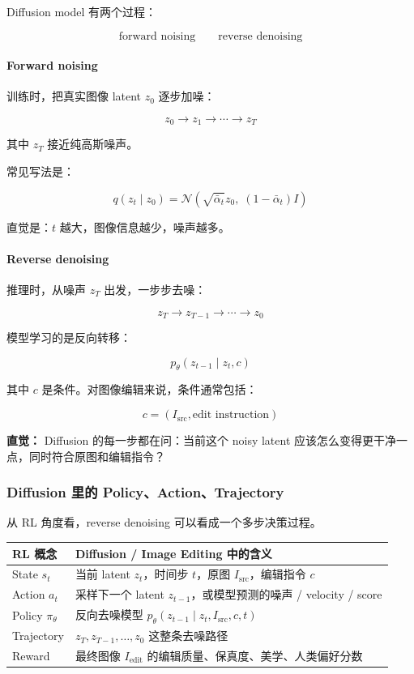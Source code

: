 Diffusion model 有两个过程：

\[
\text{forward noising}
\qquad
\text{reverse denoising}
\]

\paragraph{Forward noising}

训练时，把真实图像 latent $z_0$ 逐步加噪：

\[
z_0
\to
z_1
\to
\cdots
\to
z_T
\]

其中 $z_T$ 接近纯高斯噪声。

常见写法是：

\[
q(z_t \mid z_0)
=
\mathcal{N}
\left(
\sqrt{\bar{\alpha}_t}z_0,\;
(1-\bar{\alpha}_t)I
\right)
\]

直觉是：$t$ 越大，图像信息越少，噪声越多。

\paragraph{Reverse denoising}

推理时，从噪声 $z_T$ 出发，一步步去噪：

\[
z_T
\to
z_{T-1}
\to
\cdots
\to
z_0
\]

模型学习的是反向转移：

\[
p_\theta(z_{t-1}\mid z_t,c)
\]

其中 $c$ 是条件。对图像编辑来说，条件通常包括：

\[
c = (I_\text{src}, \text{edit instruction})
\]

\begin{intubox}
\textbf{直觉：} Diffusion 的每一步都在问：当前这个 noisy latent 应该怎么变得更干净一点，同时符合原图和编辑指令？
\end{intubox}

\subsubsection{Diffusion 里的 Policy、Action、Trajectory}

从 RL 角度看，reverse denoising 可以看成一个多步决策过程。

\begin{center}
{\small
\begin{tabular}{p{3cm}p{9.8cm}}
\hline
\textbf{RL 概念} & \textbf{Diffusion / Image Editing 中的含义} \\
\hline
State $s_t$
&
当前 latent $z_t$，时间步 $t$，原图 $I_\text{src}$，编辑指令 $c$
\\
Action $a_t$
&
采样下一个 latent $z_{t-1}$，或模型预测的噪声 / velocity / score
\\
Policy $\pi_\theta$
&
反向去噪模型 $p_\theta(z_{t-1}\mid z_t,I_\text{src},c,t)$
\\
Trajectory
&
$z_T,z_{T-1},\ldots,z_0$ 这整条去噪路径
\\
Reward
&
最终图像 $I_\text{edit}$ 的编辑质量、保真度、美学、人类偏好分数
\\
\hline
\end{tabular}
}
\end{center}

